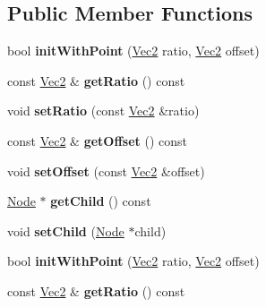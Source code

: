 \subsection*{Public Member Functions}
\begin{DoxyCompactItemize}
\item 
\mbox{\label{classPointObject_ab4a2ea65e91d83d8eb5820764c0d145b}} 
bool {\bfseries init\+With\+Point} (\hyperlink{classVec2}{Vec2} ratio, \hyperlink{classVec2}{Vec2} offset)
\item 
\mbox{\label{classPointObject_ab2da150e3155a6cd71f08c3ac7429c41}} 
const \hyperlink{classVec2}{Vec2} \& {\bfseries get\+Ratio} () const
\item 
\mbox{\label{classPointObject_a276c33781f5f91abfc4a6e215e76468e}} 
void {\bfseries set\+Ratio} (const \hyperlink{classVec2}{Vec2} \&ratio)
\item 
\mbox{\label{classPointObject_aa238ba69996046c02e9036e9c0d8b953}} 
const \hyperlink{classVec2}{Vec2} \& {\bfseries get\+Offset} () const
\item 
\mbox{\label{classPointObject_ac7d2002b8b601c72edb2b4bd4038315a}} 
void {\bfseries set\+Offset} (const \hyperlink{classVec2}{Vec2} \&offset)
\item 
\mbox{\label{classPointObject_a6b41da11fac5f69898b76571d8dd82eb}} 
\hyperlink{classNode}{Node} $\ast$ {\bfseries get\+Child} () const
\item 
\mbox{\label{classPointObject_a2de69ae66a1af86ee4c46a12e8b47386}} 
void {\bfseries set\+Child} (\hyperlink{classNode}{Node} $\ast$child)
\item 
\mbox{\label{classPointObject_ab4a2ea65e91d83d8eb5820764c0d145b}} 
bool {\bfseries init\+With\+Point} (\hyperlink{classVec2}{Vec2} ratio, \hyperlink{classVec2}{Vec2} offset)
\item 
\mbox{\label{classPointObject_ab2da150e3155a6cd71f08c3ac7429c41}} 
const \hyperlink{classVec2}{Vec2} \& {\bfseries get\+Ratio} () const
\item 

\end{DoxyCompactItemize}
